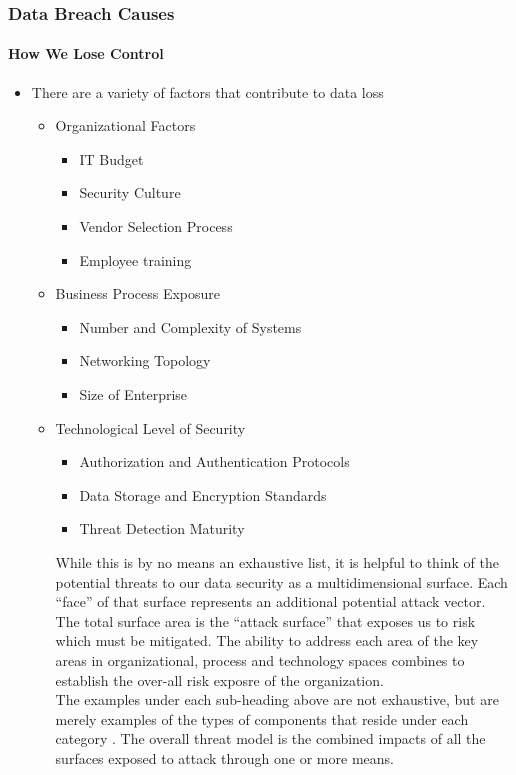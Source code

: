 \begin{frame}
  \frametitle{Data Breach Causes}
  \framesubtitle{How We Lose Control}
  \begin{itemize}
    \item<1-> There are a variety of factors that contribute to data loss
          \begin{itemize}

            \item <2-> Organizational Factors
                  \begin{itemize}
                    \item <2-> IT Budget
                    \item <2-> Security Culture
                    \item <2-> Vendor Selection Process
                    \item <2-> Employee training
                  \end{itemize}

            \item<3-> Business Process Exposure
                  \begin{itemize}
                    \item <3-> Number and Complexity of Systems
                    \item <3-> Networking Topology
                    \item <3-> Size of Enterprise
                  \end{itemize}

            \item <4->  Technological Level of Security
                  \begin{itemize}
                    \item<4-> Authorization and Authentication Protocols
                    \item<4-> Data Storage and Encryption Standards
                    \item <4-> Threat Detection Maturity
                  \end{itemize}

           {\scriptsize{While this is by no means an exhaustive list, it is helpful to think of the potential threats to our data security as a multidimensional surface. Each ``face'' of that surface represents an additional potential attack vector. The total surface area is the ``attack surface'' that exposes us to risk which must be mitigated. The ability to address each area of the key areas in organizational, process and technology spaces combines to establish the over-all risk exposre of the organization. \\ The examples under each sub-heading above are not exhaustive, but are merely examples of the types of components that reside under each category \parencite{dolezelManagingSecurityRisk2019}. The overall threat model is the combined impacts of all the surfaces exposed to attack through one or more means. }}

          \end{itemize}
  \end{itemize}
\end{frame}
